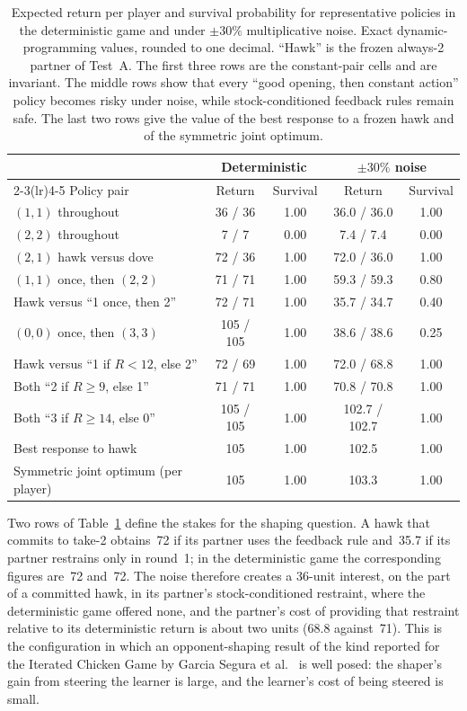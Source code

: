 \begin{table}[ht]
\centering
\small
\caption{Expected return per player and survival probability for
  representative policies in the deterministic game and under
  \(\pm 30\%\) multiplicative noise.
  Exact dynamic-programming values, rounded to one decimal.
  ``Hawk'' is the frozen always-2 partner of Test~A.
  The first three rows are the constant-pair cells and are invariant.
  The middle rows show that every ``good opening, then constant action''
  policy becomes risky under noise, while stock-conditioned feedback rules
  remain safe.
  The last two rows give the value of the best response to a frozen hawk
  and of the symmetric joint optimum.}
\label{tab:noise-dp}
\begin{tabular}{lcccc}
\toprule
 & \multicolumn{2}{c}{Deterministic} & \multicolumn{2}{c}{\(\pm 30\%\) noise} \\
\cmidrule(lr){2-3}\cmidrule(lr){4-5}
Policy pair & Return & Survival & Return & Survival \\
\midrule
\((1,1)\) throughout & 36 / 36 & 1.00 & 36.0 / 36.0 & 1.00 \\
\((2,2)\) throughout & 7 / 7 & 0.00 & 7.4 / 7.4 & 0.00 \\
\((2,1)\) hawk versus dove & 72 / 36 & 1.00 & 72.0 / 36.0 & 1.00 \\
\midrule
\((1,1)\) once, then \((2,2)\) & 71 / 71 & 1.00 & 59.3 / 59.3 & 0.80 \\
Hawk versus ``1 once, then 2'' & 72 / 71 & 1.00 & 35.7 / 34.7 & 0.40 \\
\((0,0)\) once, then \((3,3)\) & 105 / 105 & 1.00 & 38.6 / 38.6 & 0.25 \\
\midrule
Hawk versus ``1 if \(R<12\), else 2'' & 72 / 69 & 1.00 & 72.0 / 68.8 & 1.00 \\
Both ``2 if \(R \ge 9\), else 1'' & 71 / 71 & 1.00 & 70.8 / 70.8 & 1.00 \\
Both ``3 if \(R \ge 14\), else 0'' & 105 / 105 & 1.00 & 102.7 / 102.7 & 1.00 \\
\midrule
Best response to hawk & 105 & 1.00 & 102.5 & 1.00 \\
Symmetric joint optimum (per player) & 105 & 1.00 & 103.3 & 1.00 \\
\bottomrule
\end{tabular}
\end{table}

Two rows of Table~\ref{tab:noise-dp} define the stakes for the shaping
question.
A hawk that commits to take-2 obtains~72 if its partner uses the feedback
rule and~35.7 if its partner restrains only in round~1; in the
deterministic game the corresponding figures are~72 and~72.
The noise therefore creates a 36-unit interest, on the part of a
committed hawk, in its partner's stock-conditioned restraint, where the
deterministic game offered none, and the partner's cost of providing that
restraint relative to its deterministic return is about two units
(68.8 against~71).
This is the configuration in which an opponent-shaping result of the kind
reported for the Iterated Chicken Game by Garcia Segura et al.\
\cite{garciasegura2025} is well posed: the shaper's gain from steering the
learner is large, and the learner's cost of being steered is small.

